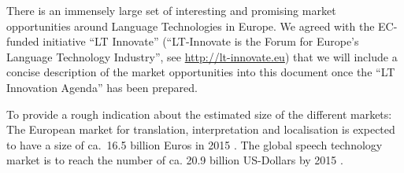 \documentclass[10pt, plain]{../../metanetpaper}
\begin{document}
\begin{multicols}{2}
There is an immensely large set of interesting and promising market opportunities around Language Technologies in Europe. We agreed with the EC-funded initiative ``LT Innovate'' (``LT-Innovate is the Forum for Europe's Language Technology Industry'', see \url{http://lt-innovate.eu}) that we will include a concise description of the market opportunities into this document once the ``LT Innovation Agenda'' has been prepared.

To provide a rough indication about the estimated size of the different markets: The European market for translation, interpretation and localisation is expected to have a size of ca.~16.5 billion Euros in 2015 \cite{EC3}. The global speech technology market is to reach the number of ca. 20.9 billion US-Dollars by 2015 \cite{gia2012}.

\end{multicols}

\clearpage
\end{document}
